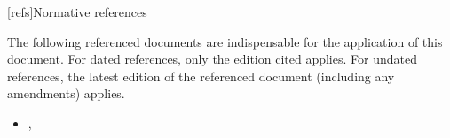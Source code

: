 
[refs]{Normative references}

\pnum
The following referenced documents are indispensable for the application of this
document. For dated references, only the edition cited applies. For undated
references, the latest edition of the referenced document (including any
amendments) applies.

\begin{itemize}
\item {\cppstddocno}, 
\end{itemize}

